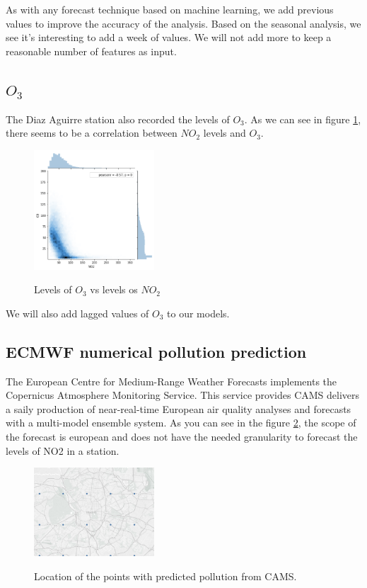 \documentclass[a4paper,twocolumn,5p]{elsarticle}
\begin{document}
As with any forecast technique based on machine learning, we add previous values to improve the accuracy 
of the analysis. Based on the seasonal analysis, we see it's interesting to add a week of values. We will not 
add more to keep a reasonable number of features as input.

\subsection{$O_3$}

The Diaz Aguirre station also recorded the levels of $O_3$. As we can see in figure \ref{figure:no2vso3},
there seems to be a correlation between $NO_2$ levels and $O_3$.

\begin{figure}
  \caption{Levels of $O_3$ vs levels os $NO_2$}
  \centering
  \includegraphics[width=0.4\textwidth]{no2vso3}
  \label{figure:no2vso3}
\end{figure}

We will also add lagged values of $O_3$ to our models.

\subsection{ECMWF numerical pollution prediction}
\label{sec:ecmwf-numer-poll}

The European Centre for Medium-Range Weather Forecasts implements the Copernicus Atmosphere Monitoring Service.
This service provides CAMS delivers a saily production of near-real-time European air quality analyses and forecasts 
with a multi-model ensemble system. 
As you can see in the figure \ref{figure:camspoints}, the scope of the forecast is european and does not have the needed granularity to forecast 
the levels of NO2 in a station.

\begin{figure}
  \caption{Location of the points with predicted pollution from CAMS.}
  \centering
  \includegraphics[width=0.4\textwidth]{camspoints}
  \label{figure:camspoints}
\end{figure}
\end{document}
